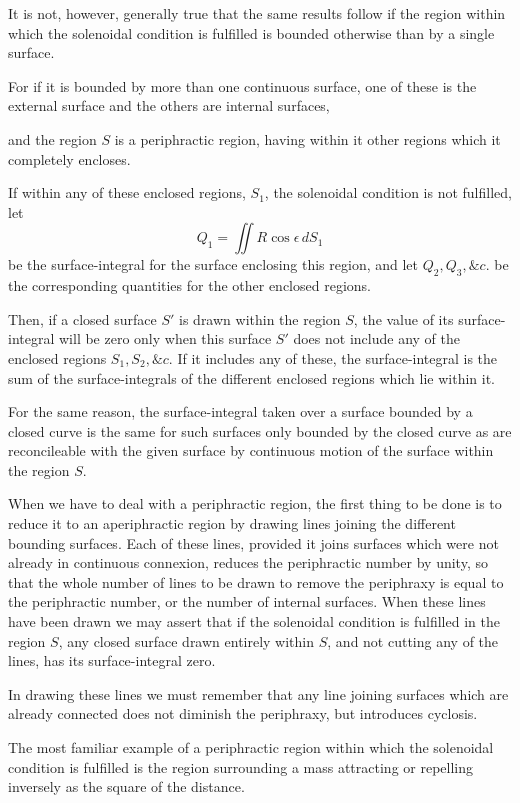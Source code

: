 \documentclass[11pt,a4paper]{article}
\begin{document}
It is not, however, generally true that the same results follow if the
region within which the solenoidal condition is fulfilled is bounded
otherwise than by a single surface.

For if it is bounded by more than one continuous surface, one of these
is the external surface and the others are internal surfaces,

\clearpage

and the region \(S\) is a periphractic region, having within it other
regions which it completely encloses.

If within any of these enclosed regions, \(S_1\), the solenoidal
condition is not fulfilled, let
\[
Q_1=\iint R\cos\epsilon\,dS_1
\]
be the surface-integral for the surface enclosing this region, and let
\(Q_2,Q_3,\&c.\) be the corresponding quantities for the other enclosed
regions.

Then, if a closed surface \(S'\) is drawn within the region \(S\), the
value of its surface-integral will be zero only when this surface \(S'\)
does not include any of the enclosed regions \(S_1,S_2,\&c.\) If it
includes any of these, the surface-integral is the sum of the
surface-integrals of the different enclosed regions which lie within it.

For the same reason, the surface-integral taken over a surface bounded
by a closed curve is the same for such surfaces only bounded by the
closed curve as are reconcileable with the given surface by continuous
motion of the surface within the region \(S\).

When we have to deal with a periphractic region, the first thing to be
done is to reduce it to an aperiphractic region by drawing lines joining
the different bounding surfaces. Each of these lines, provided it joins
surfaces which were not already in continuous connexion, reduces the
periphractic number by unity, so that the whole number of lines to be
drawn to remove the periphraxy is equal to the periphractic number, or
the number of internal surfaces. When these lines have been drawn we may
assert that if the solenoidal condition is fulfilled in the region
\(S\), any closed surface drawn entirely within \(S\), and not cutting
any of the lines, has its surface-integral zero.

In drawing these lines we must remember that any line joining surfaces
which are already connected does not diminish the periphraxy, but
introduces cyclosis.

The most familiar example of a periphractic region within which the
solenoidal condition is fulfilled is the region surrounding a mass
attracting or repelling inversely as the square of the distance.
\end{document}
